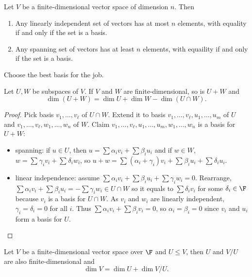 \documentclass[a4paper]{article}
\theoremstyle{definition}
\begin{document}
\begin{corollary}
  Let \(V\) be a finite-dimensional vector space of dimension \(n\). Then
  \begin{enumerate}
  \item Any linearly independent set of vectors has at most \(n\) elements, with equality if and only if the set is a basis.
  \item Any spanning set of vectors has at least \(n\) elements, with equaility if and only if the set is a basis.
  \end{enumerate}
\end{corollary}

\begin{slogan}
  Choose the best basis for the job.
\end{slogan}

\begin{theorem}
  Let \(U, W\) be subspaces of \(V\). If \(V\) and \(W\) are finite-dimensional, so is \(U+W\) and
  \[
\dim(U+W) = \dim U + \dim W - \dim(U\cap W).
  \]
\end{theorem}

\begin{proof}
  Pick basis \(v_1,\ldots, v_\ell\) of \(U\cap W\). Extend it to basis \(v_1,\ldots,v_\ell,u_1,\ldots,u_m\) of \(U\) and \(v_1,\ldots,v_\ell,w_1,\ldots,w_n\) of \(W\). Claim \(v_1,\ldots, v_\ell,u_1,\ldots,u_m,w_1,\ldots,w_n\) is a basis for \(U+W\):
  \begin{itemize}
  \item spanning: if \(u\in U\), then \(u= \sum \alpha_iv_i + \sum \beta_iu_i\) and if \(w\in W\), \(w = \sum_{}^{}\gamma_iv_i + \sum_{}^{}\delta_iw_i\), so \(u+w = \sum_{}^{}(\alpha_i + \gamma_i)v_i + \sum_{}^{}\beta_iu_i + \sum_{}^{}\delta_iu_i\).
  \item linear independence: assume \(\sum \alpha_iv_i + \sum \beta_iu_i+ \sum \gamma_iw_i=0\). Rearrange, \(\sum\alpha_iv_i + \sum\beta_iu_i = -\sum\gamma_iw_i \in U\cap W\) so it equals to \(\sum\delta_iv_i\) for some \(\delta_i\in \F\) because \(v_i\) is a basis for \(U\cap W\). As \(v_i\) and \(w_i\) are linearly independent, \(\gamma_i=\delta_i=0\) for all \(i\). Thus \(\sum\alpha_iv_i + \sum\beta_iv_i=0\), so \(\alpha_i=\beta_i=0\) since \(v_i\) and \(u_i\) form a basis for \(U\).
  \end{itemize}
\end{proof}

\begin{theorem}
  Let \(V\) be a finite-dimensional vector space over \(\F\) and \(U \leq V\), then \(U\) and \(V/U\) are also finite-dimensional and
  \[
\dim V = \dim U + \dim V/U.
  \]
\end{theorem}
\end{document}
